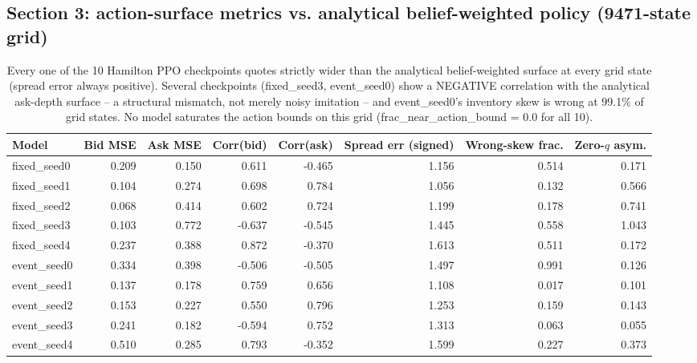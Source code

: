 
\subsection*{Section 3: action-surface metrics vs. analytical belief-weighted policy (9471-state grid)}
\begin{table}[h]
\centering
\small
\begin{tabular}{lrrrrrrr}
\hline
Model & Bid MSE & Ask MSE & Corr(bid) & Corr(ask) & Spread err (signed) & Wrong-skew frac. & Zero-$q$ asym. \\
\hline
fixed\_seed0 & 0.209 & 0.150 & 0.611  & -0.465 & 1.156 & 0.514 & 0.171 \\
fixed\_seed1 & 0.104 & 0.274 & 0.698  &  0.784 & 1.056 & 0.132 & 0.566 \\
fixed\_seed2 & 0.068 & 0.414 & 0.602  &  0.724 & 1.199 & 0.178 & 0.741 \\
fixed\_seed3 & 0.103 & 0.772 & -0.637 & -0.545 & 1.445 & 0.558 & 1.043 \\
fixed\_seed4 & 0.237 & 0.388 & 0.872  & -0.370 & 1.613 & 0.511 & 0.172 \\
event\_seed0 & 0.334 & 0.398 & -0.506 & -0.505 & 1.497 & 0.991 & 0.126 \\
event\_seed1 & 0.137 & 0.178 & 0.759  &  0.656 & 1.108 & 0.017 & 0.101 \\
event\_seed2 & 0.153 & 0.227 & 0.550  &  0.796 & 1.253 & 0.159 & 0.143 \\
event\_seed3 & 0.241 & 0.182 & -0.594 &  0.752 & 1.313 & 0.063 & 0.055 \\
event\_seed4 & 0.510 & 0.285 & 0.793  & -0.352 & 1.599 & 0.227 & 0.373 \\
\hline
\end{tabular}
\caption{Every one of the 10 Hamilton PPO checkpoints quotes strictly wider than the analytical
belief-weighted surface at every grid state (spread error always positive). Several checkpoints
(fixed\_seed3, event\_seed0) show a NEGATIVE correlation with the analytical ask-depth surface --
a structural mismatch, not merely noisy imitation -- and event\_seed0's inventory skew is wrong at
99.1\% of grid states. No model saturates the action bounds on this grid
(frac\_near\_action\_bound = 0.0 for all 10).}
\end{table}

